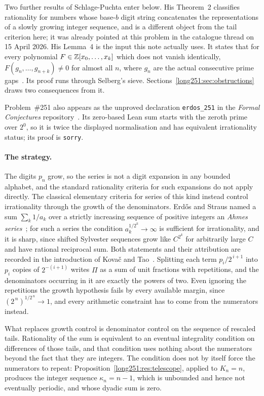 \documentclass[11pt]{article}
\begin{document}
Two further results of Schlage-Puchta enter below.  His Theorem~2 classifies
rationality for numbers whose base-$b$ digit string concatenates the
representations of a slowly growing integer sequence, and is a different
object from the tail criterion here; it was already pointed at this problem in
the catalogue thread on 15 April 2026.  His Lemma~4 is the input this note
actually uses.  It states that for every polynomial $F\in\mathbb{Z}[x_0,\ldots,x_k]$
which does not vanish identically, $F(g_n,\ldots,g_{n+k})\ne0$ for almost all
$n$, where $g_n$ are the actual consecutive prime
gaps~\cite[Lemma~4, pp.~5--6]{schlagepuchta2011}.  Its proof runs through
Selberg's sieve.  Sections~\ref{long251:sec:obstructions} draws two consequences from
it.

Problem~\#251 also appears as the unproved declaration \texttt{erdos\_251} in
the \emph{Formal Conjectures} repository~\cite{formalconjectures251}.  Its
zero-based Lean sum starts with the zeroth prime over $2^0$, so it is twice the
displayed normalisation and has equivalent irrationality status; its proof is
\texttt{sorry}.

\paragraph{The strategy.}
The digits $p_n$ grow, so the series is not a digit expansion in any bounded
alphabet, and the standard rationality criteria for such expansions do not
apply directly.  The classical elementary criteria for series of this kind
instead control irrationality through the growth of the denominators.
Erd\H{o}s and Straus named a sum $\sum_k 1/a_k$ over a strictly increasing
sequence of positive integers an \emph{Ahmes series}~\cite{erdosstraus1963};
for such a series the condition $a_k^{1/2^k}\to\infty$ is sufficient for
irrationality, and it is sharp, since shifted Sylvester sequences grow like
$C^{2^{k}}$ for arbitrarily large $C$ and have rational reciprocal sum.  Both
statements and their attribution are recorded in the introduction of Kova\v{c}
and Tao~\cite[\S1]{kovactao2024}.  Splitting each term $p_i/2^{\,i+1}$ into
$p_i$ copies of $2^{-(i+1)}$ writes $\Pi$ as a sum of unit fractions with
repetitions, and the denominators occurring in it are exactly the powers of
two.  Even ignoring the repetitions the growth hypothesis fails by every
available margin, since $(2^{\,n})^{1/2^{\,n}}\to1$, and every arithmetic
constraint has to come from the numerators instead.

What replaces growth control is denominator control on the sequence of
rescaled tails.  Rationality of the sum is equivalent to an eventual
integrality condition on differences of those tails, and that condition uses
nothing about the numerators beyond the fact that they are integers.  The
condition does not by itself force the numerators to repeat:
Proposition~\ref{long251:res:telescope}, applied to $K_n=n$, produces the integer
sequence $\kappa_n=n-1$, which is unbounded and hence not eventually periodic,
and whose dyadic sum is zero.
\end{document}
